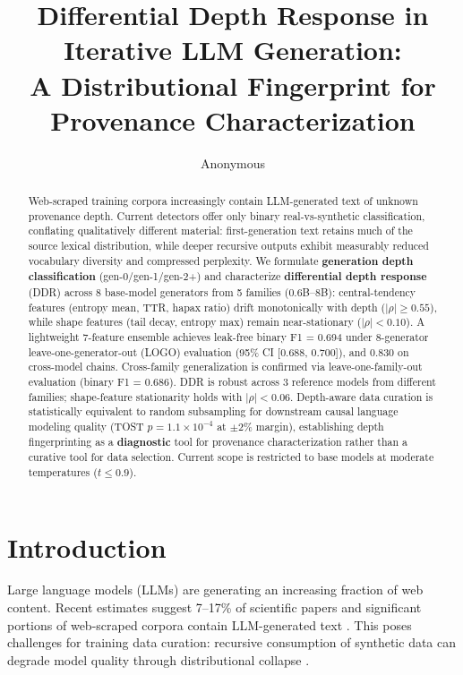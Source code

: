 \documentclass[11pt,twocolumn]{article}
\title{Differential Depth Response in Iterative LLM Generation:\\
A Distributional Fingerprint for Provenance Characterization}
\author{Anonymous}
\date{}
\begin{document}
\maketitle

\begin{abstract}
Web-scraped training corpora increasingly contain LLM-generated text of unknown provenance depth.
Current detectors offer only binary real-vs-synthetic classification, conflating qualitatively different material:
first-generation text retains much of the source lexical distribution, while deeper recursive outputs exhibit measurably reduced vocabulary diversity and compressed perplexity.
We formulate \textbf{generation depth classification} (gen-0/gen-1/gen-2+) and characterize \textbf{differential depth response} (DDR) across 8 base-model generators from 5 families (0.6B--8B):
central-tendency features (entropy mean, TTR, hapax ratio) drift monotonically with depth ($|\rho| \geq 0.55$), while shape features (tail decay, entropy max) remain near-stationary ($|\rho| < 0.10$).
A lightweight 7-feature ensemble achieves leak-free binary F1 = 0.694 under 8-generator leave-one-generator-out (LOGO) evaluation (95\% CI [0.688, 0.700]), and 0.830 on cross-model chains.
Cross-family generalization is confirmed via leave-one-family-out evaluation (binary F1 = 0.686).
DDR is robust across 3 reference models from different families; shape-feature stationarity holds with $|\rho| < 0.06$.
Depth-aware data curation is statistically equivalent to random subsampling for downstream causal language modeling quality (TOST $p = 1.1 \times 10^{-4}$ at $\pm 2\%$ margin), establishing depth fingerprinting as a \textbf{diagnostic} tool for provenance characterization rather than a curative tool for data selection.
Current scope is restricted to base models at moderate temperatures ($t \leq 0.9$).
\end{abstract}

\section{Introduction}

Large language models (LLMs) are generating an increasing fraction of web content.
Recent estimates suggest 7--17\% of scientific papers and significant portions of web-scraped corpora contain LLM-generated text \citep{liang2024monitoring}.
This poses challenges for training data curation: recursive consumption of synthetic data can degrade model quality through distributional collapse \citep{shumailov2024model}.
\end{document}
